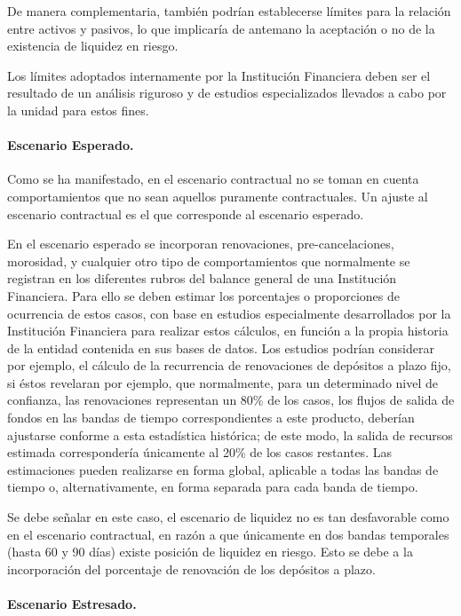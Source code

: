 \documentclass[]{article}
\begin{document}
De manera complementaria, también podrían establecerse límites para la
relación entre activos y pasivos, lo que implicaría de antemano la
aceptación o no de la existencia de liquidez en riesgo.

Los límites adoptados internamente por la Institución Financiera deben
ser el resultado de un análisis riguroso y de estudios especializados
llevados a cabo por la unidad para estos fines.

\hypertarget{escenario-esperado.}{%
\paragraph{Escenario Esperado.}\label{escenario-esperado.}}

Como se ha manifestado, en el escenario contractual no se toman en
cuenta comportamientos que no sean aquellos puramente contractuales. Un
ajuste al escenario contractual es el que corresponde al escenario
esperado.

En el escenario esperado se incorporan renovaciones, pre-cancelaciones,
morosidad, y cualquier otro tipo de comportamientos que normalmente se
registran en los diferentes rubros del balance general de una
Institución Financiera. Para ello se deben estimar los porcentajes o
proporciones de ocurrencia de estos casos, con base en estudios
especialmente desarrollados por la Institución Financiera para realizar
estos cálculos, en función a la propia historia de la entidad contenida
en sus bases de datos. Los estudios podrían considerar por ejemplo, el
cálculo de la recurrencia de renovaciones de depósitos a plazo fijo, si
éstos revelaran por ejemplo, que normalmente, para un determinado nivel
de confianza, las renovaciones representan un 80\% de los casos, los
flujos de salida de fondos en las bandas de tiempo correspondientes a
este producto, deberían ajustarse conforme a esta estadística histórica;
de este modo, la salida de recursos estimada correspondería únicamente
al 20\% de los casos restantes. Las estimaciones pueden realizarse en
forma global, aplicable a todas las bandas de tiempo o,
alternativamente, en forma separada para cada banda de tiempo.

Se debe señalar en este caso, el escenario de liquidez no es tan
desfavorable como en el escenario contractual, en razón a que únicamente
en dos bandas temporales (hasta 60 y 90 días) existe posición de
liquidez en riesgo. Esto se debe a la incorporación del porcentaje de
renovación de los depósitos a plazo.

\hypertarget{escenario-estresado.}{%
\paragraph{Escenario Estresado.}\label{escenario-estresado.}}
\end{document}
